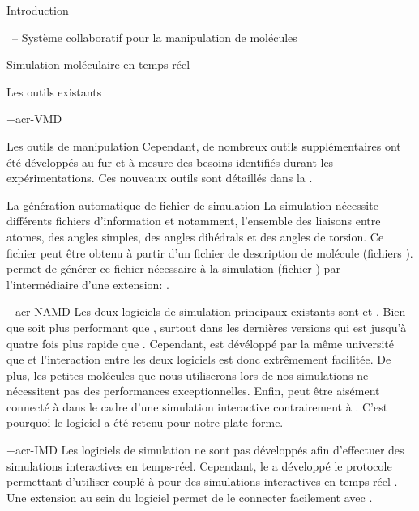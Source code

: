 \documentclass[myfrancais]{mythesis}
\begin{document}
\begin{mypart}{Introduction}
\begin{mychapter}{\myShaddock\ -- Système collaboratif pour la manipulation de molécules}
\begin{mysection}{Simulation moléculaire en temps-réel}
\begin{mysubsection}{Les outils existants}
\begin{mysubsubsection}{\myacronl+{acr-VMD}}
\begin{myparagraph}{Les outils de manipulation}
							Cependant, de nombreux outils supplémentaires ont été développés au-fur-et-à-mesure des besoins identifiés durant les expérimentations.
							Ces nouveaux outils sont détaillés dans la .
						\end{myparagraph}
						\begin{myparagraph}{La génération automatique de fichier de simulation}
							La simulation nécessite différents fichiers d'information et notamment, l'ensemble des liaisons entre atomes, des angles simples, des angles dihédrals et des angles de torsion.
							Ce fichier peut être obtenu à partir d'un fichier de description de molécule (fichiers \myPDB).
							 permet de générer ce fichier nécessaire à la simulation (fichier \myPSF) par l'intermédiaire d'une extension: .
						\end{myparagraph}
					\end{mysubsubsection}
					\begin{mysubsubsection}{\myacronl+{acr-NAMD}}
						Les deux logiciels de simulation principaux existants sont   et \myGromacs {}.
						Bien que \myGromacs soit plus performant que , surtout dans les dernières versions  qui est jusqu'à quatre fois plus rapide que .
						Cependant,  est dévéloppé par la même université que  et l'interaction entre les deux logiciels est donc extrêmement facilitée.
						De plus, les petites molécules que nous utiliserons lors de nos simulations ne nécessitent pas des performances exceptionnelles.
						Enfin,  peut être aisément connecté à  dans le cadre d'une simulation interactive  contrairement à \myGromacs.
						C'est pourquoi le logiciel  a été retenu pour notre plate-forme.
					\end{mysubsubsection}
					\begin{mysubsubsection}{\myacronl+{acr-IMD}}
						Les logiciels de simulation ne sont pas développés afin d'effectuer des simulations interactives en temps-réel.
						Cependant, le  a développé le protocole  permettant d'utiliser  couplé à  pour des simulations interactives en temps-réel .
						Une extension au sein du logiciel  permet de le connecter facilement avec .


\end{mysubsubsection}
\end{mysubsection}
\end{mysection}
\end{mychapter}
\end{mypart}
\end{document}
